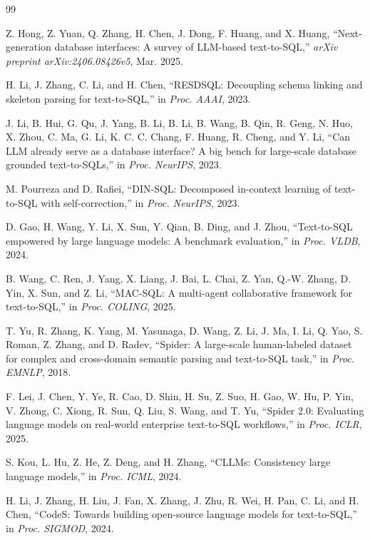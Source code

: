 \begin{thebibliography}{99}


 Z. Hong, Z. Yuan, Q. Zhang, H. Chen, J. Dong, F. Huang, and X. Huang, “Next-generation database interfaces: A survey of LLM-based text-to-SQL,” \emph{arXiv preprint arXiv:2406.08426v5}, Mar. 2025.

 H. Li, J. Zhang, C. Li, and H. Chen, “RESDSQL: Decoupling schema linking and skeleton parsing for text-to-SQL,” in \emph{Proc. AAAI}, 2023.

 J. Li, B. Hui, G. Qu, J. Yang, B. Li, B. Li, B. Wang, B. Qin, R. Geng, N. Huo, X. Zhou, C. Ma, G. Li, K. C. C. Chang, F. Huang, R. Cheng, and Y. Li, “Can LLM already serve as a database interface? A big bench for large-scale database grounded text-to-SQLs,” in \emph{Proc. NeurIPS}, 2023.

 M. Pourreza and D. Rafiei, “DIN-SQL: Decomposed in-context learning of text-to-SQL with self-correction,” in \emph{Proc. NeurIPS}, 2023.

 D. Gao, H. Wang, Y. Li, X. Sun, Y. Qian, B. Ding, and J. Zhou, “Text-to-SQL empowered by large language models: A benchmark evaluation,” in \emph{Proc. VLDB}, 2024.

 B. Wang, C. Ren, J. Yang, X. Liang, J. Bai, L. Chai, Z. Yan, Q.-W. Zhang, D. Yin, X. Sun, and Z. Li, “MAC-SQL: A multi-agent collaborative framework for text-to-SQL,” in \emph{Proc. COLING}, 2025.

 T. Yu, R. Zhang, K. Yang, M. Yasunaga, D. Wang, Z. Li, J. Ma, I. Li, Q. Yao, S. Roman, Z. Zhang, and D. Radev, “Spider: A large-scale human-labeled dataset for complex and cross-domain semantic parsing and text-to-SQL task,” in \emph{Proc. EMNLP}, 2018.

 F. Lei, J. Chen, Y. Ye, R. Cao, D. Shin, H. Su, Z. Suo, H. Gao, W. Hu, P. Yin, V. Zhong, C. Xiong, R. Sun, Q. Liu, S. Wang, and T. Yu, “Spider 2.0: Evaluating language models on real-world enterprise text-to-SQL workflows,” in \emph{Proc. ICLR}, 2025.

 S. Kou, L. Hu, Z. He, Z. Deng, and H. Zhang, “CLLMs: Consistency large language models,” in \emph{Proc. ICML}, 2024.

 H. Li, J. Zhang, H. Liu, J. Fan, X. Zhang, J. Zhu, R. Wei, H. Pan, C. Li, and H. Chen, “CodeS: Towards building open-source language models for text-to-SQL,” in \emph{Proc. SIGMOD}, 2024.


\end{thebibliography}
